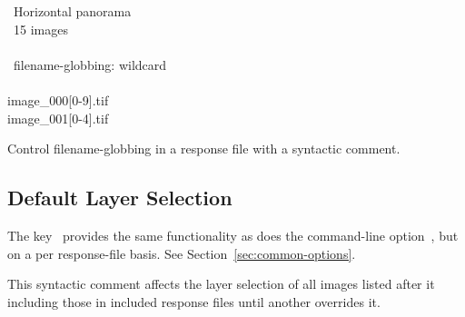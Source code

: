 \begin{exemplar}[htbp]
  \begin{literal}
    ~Horizontal panorama \\
    ~15 images \\
    \mbox{} \\
    ~filename-globbing: wildcard \\
    \mbox{} \\
    image\_000[0-9].tif \\
    image\_001[0-4].tif \\
  \end{literal}

  \caption[Filename-globbing syntactic comment]{Control
    filename-globbing in a response file with a syntactic
    comment.\label{ex:globbing-algorithm}}
\end{exemplar}


\subsection[Default Layer Selection]{Default Layer Selection
  \label{sec:default-layer-selection}
  }

The key~ provides the same
functionality as does the command\hyp{}line
option~, but on a per response\hyp{}file
basis.  See Section~\ref{sec:common-options}.

This syntactic comment affects the layer selection of all images
listed after it including those in included response files until
another  overrides it.

